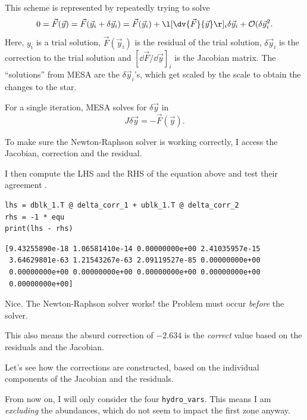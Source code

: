 \documentclass[a4paper,10pt]{article}
\begin{document}
This scheme is represented by repeatedly trying to solve \citep{paxton2010}
\begin{equation*}
    0 = \vec{F}(\vec{y}) = \vec{F}(\vec{y}_{i} + \delta \vec{y}_{i}) = \vec{F} (\vec{y}_{i}) + \l[\dv{\vec{F} }{\vec{y}}\r]_{i} \delta \vec{y}_{i} + \mathcal{O} (\delta \vec{y}_{i}^{2}.
\end{equation*}
Here, \(y_{i} \) is a trial solution, \(\vec{F} (\vec{ y}_{i} ) \) is the residual of the trial solution, \(\delta \vec{y}_{i} \) is the correction to the trial solution and \([\dd{\vec{F} } / \dd{\vec{y} }]_{i} \) is the Jacobian matrix.
The ``solutions'' from MESA are the \(\delta \vec{y}_{i} \)'s, which get scaled by the scale to obtain the changes to the star.

For a single iteration, MESA solves for \(\delta \vec{y} \) in
\begin{equation*}
    J \delta \vec{y} = - \vec{F}(\vec{y} ).
\end{equation*}

To make sure the Newton-Raphson solver is working correctly, I access the Jacobian, correction and the residual.

I then compute the LHS and the RHS of the equation above and test their agreement
.
\begin{verbatim}
lhs = dblk_1.T @ delta_corr_1 + ublk_1.T @ delta_corr_2
rhs = -1 * equ
print(lhs - rhs)
\end{verbatim}

\begin{verbatim}
[9.43255890e-18 1.06581410e-14 0.00000000e+00 2.41035957e-15
 3.64629801e-63 1.21543267e-63 2.09119527e-85 0.00000000e+00
 0.00000000e+00 0.00000000e+00 0.00000000e+00 0.00000000e+00
 0.00000000e+00]
\end{verbatim}
Nice. The Newton-Raphson solver works! the Problem must occur \emph{before} the solver.

This also means the absurd correction of \(-2.634\) is the \emph{correct} value based on the residuals and the Jacobian.

Let's see how the corrections are constructed, based on the individual components of the Jacobian and the residuals.

From now on, I will only consider the four \lstinline[style=output, breaklines=true]|hydro_vars|. This means I am \emph{excluding} the abundances, which do not seem to impact the first zone anyway.
\end{document}
